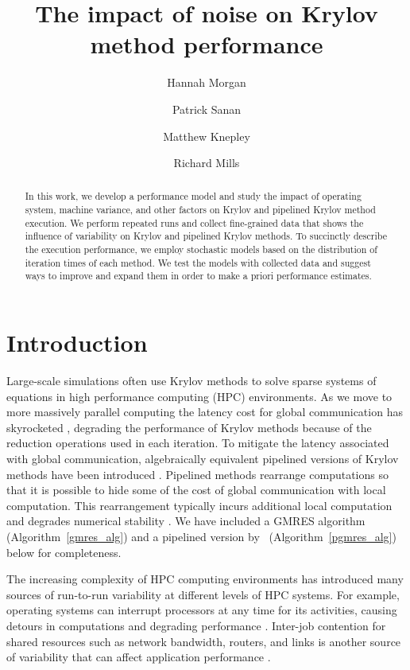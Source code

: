 \documentclass[num-refs]{wiley-article}
\title{The impact of noise on Krylov method performance}
\author[1]{Hannah Morgan}
\author[2]{Patrick Sanan}
\author[3]{Matthew Knepley}
\author[1]{Richard Mills}
\affil[1]{Mathematics and Computer Science, Argonne National Laboratory, Argonne, Illinois, USA}
\affil[2]{Institute of Geophysics,  ETH Zurich,  Zurich, Switzerland}
\affil[3]{Computer Science in Engineering, University of Buffalo, Buffalo, New York, USA}
\begin{document}
\maketitle

\begin{abstract}
In this work, we develop a performance model and study the impact of 
operating system, machine variance, and other factors on Krylov and pipelined Krylov method execution.
We perform repeated runs and collect fine-grained data that 
 shows the influence of variability on Krylov and pipelined Krylov methods.
To succinctly describe the execution performance, we 
 employ stochastic models based on the distribution of iteration times of each method.
 We test the models with collected data and suggest ways to improve and expand them in order to make a priori performance estimates.
\end{abstract}

\section{Introduction}


Large-scale simulations often use Krylov methods \cite{saad96iterative} to solve sparse systems of equations in high performance computing (HPC) environments. 
As we move to more massively parallel computing the latency cost for global communication has skyrocketed \cite{HPCChallenge}, degrading the performance of Krylov methods because of the reduction operations used in each iteration.
To mitigate the latency associated with global communication, algebraically equivalent pipelined versions of Krylov methods have been introduced 
\cite{Chronopoulos_Gear_1989, Ghysels_Ashby_Meerbergen_Vanroose_2012, GhyselsVanroose2014, StrzodkaGoddeke06, Sturler_Vorst_1995, JacquesNicolasVollaire12}. 
Pipelined methods rearrange computations so that it is possible to hide some of the cost of global communication with local computation. 
This rearrangement typically incurs additional local computation and degrades numerical stability \cite{Cools2018, CarsonEtAl2018}. 
We have included a GMRES algorithm (Algorithm~\ref{gmres_alg}) and a pipelined version by~\cite{Ghysels_Ashby_Meerbergen_Vanroose_2012} (Algorithm~\ref{pgmres_alg}) below for completeness. 

The increasing complexity of HPC computing environments has introduced many sources of run-to-run variability at different levels of HPC systems. 
For example, operating systems can interrupt processors at any time for its activities, causing detours in computations and degrading performance \cite{hoefler2010characterizing, FerreiraBridgesBrightwell08}.
Inter-job contention for shared resources such as network bandwidth, routers, and links is another source of variability that can affect application performance \cite{parker2017early, chunduri2017run}. 
\end{document}
